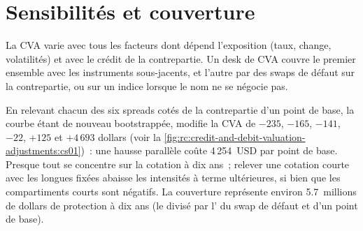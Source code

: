 \begin{omfigure}

\label{fig:rc:credit-and-debit-valuation-adjustments:wwr}
\end{omfigure}

\section{Sensibilités et couverture}

La CVA varie avec tous les facteurs dont dépend l'exposition (taux, change, volatilités) et avec le crédit de la
contrepartie. Un desk de CVA couvre le premier ensemble avec les instruments sous-jacents, et
l'autre par des swaps de défaut sur la contrepartie, ou sur un indice lorsque le nom ne
se négocie pas.

\begin{example}\label{ex:rc:credit-and-debit-valuation-adjustments:cs01}
En relevant chacun des six spreads cotés de la contrepartie d'un point de base, la courbe étant
de nouveau bootstrappée, modifie la CVA de $-235$, $-165$, $-141$, $-22$, $+125$ et $+4\,693$ dollars
(voir la \cref{fig:rc:credit-and-debit-valuation-adjustments:cs01})~: une hausse parallèle coûte
4\,254~USD par point de base. Presque tout se concentre sur la cotation à dix ans~; relever une cotation courte
avec les longues fixées abaisse les intensités à terme ultérieures, si bien que les compartiments courts sont négatifs.
La couverture représente environ 5.7~millions de dollars de protection à dix ans (le  divisé par
l' du swap de défaut et d'un point de base).
\end{example}

